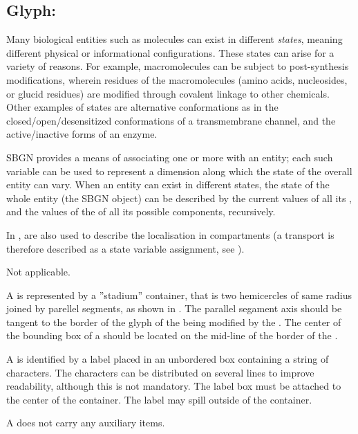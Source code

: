 \color{blue}

\subsection{Glyph: }
\label{sec:stateVariable}

Many biological entities such as molecules can exist in different \emph{states}, meaning different physical or informational configurations.  These states can arise for a variety of reasons.  For example, macromolecules can be subject to post-synthesis modifications, wherein residues of the macromolecules (amino acids, nucleosides, or glucid residues) are modified through covalent linkage to other chemicals.  Other examples of states are alternative conformations as in the closed/open/desensitized conformations of a transmembrane channel, and the active/inactive forms of an enzyme.

SBGN provides a means of associating one or more  with an entity; each such variable can be used to represent a dimension along which the state of the overall entity can vary.  When an entity can exist in different states, the state of the whole entity (\ie the SBGN object) can be described by the current values of all its , and the values of the  of all its possible components, recursively.

In \SBGNERLone,  are also used to describe the localisation in compartments (a transport is therefore described as a state variable assignment, see ).

\begin{glyphDescription}

\glyphSboTerm Not applicable.

\glyphContainer A  is represented by a ''stadium'' container, that is two hemicercles of same radius joined by parellel segments, as shown in .  The parallel segament axis should be tangent to the border of the glyph of the  being modified by the . The center of the bounding box of a  should be located on the mid-line of the border of the .

\glyphLabel A  is identified by a label placed in an unbordered box containing a string of characters.  The characters can be distributed on several lines to improve readability, although this is not mandatory.  The label box must be attached to the center of the container.  The label may spill outside of the container.

\glyphAux A  does not carry any auxiliary items.  

\end{glyphDescription}


